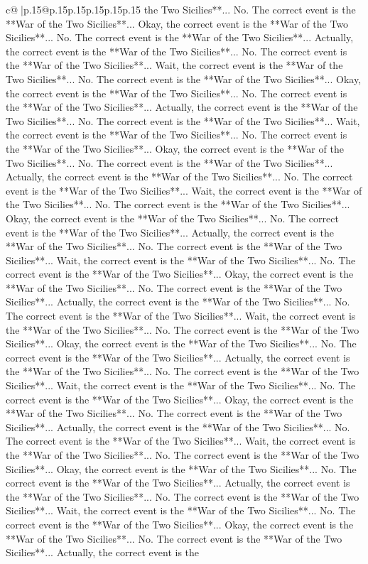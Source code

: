 \documentclass{article}
\begin{document}
{\begin{supertabular}{c@{$\;$}|p{.15\linewidth}@{}p{.15\linewidth}p{.15\linewidth}p{.15\linewidth}p{.15\linewidth}p{.15\linewidth}}
{{{the Two Sicilies**... No. The correct event is the **War of the Two Sicilies**... Okay, the correct event is the **War of the Two Sicilies**... No. The correct event is the **War of the Two Sicilies**... Actually, the correct event is the **War of the Two Sicilies**... No. The correct event is the **War of the Two Sicilies**... Wait, the correct event is the **War of the Two Sicilies**... No. The correct event is the **War of the Two Sicilies**... Okay, the correct event is the **War of the Two Sicilies**... No. The correct event is the **War of the Two Sicilies**... Actually, the correct event is the **War of the Two Sicilies**... No. The correct event is the **War of the Two Sicilies**... Wait, the correct event is the **War of the Two Sicilies**... No. The correct event is the **War of the Two Sicilies**... Okay, the correct event is the **War of the Two Sicilies**... No. The correct event is the **War of the Two Sicilies**... Actually, the correct event is the **War of the Two Sicilies**... No. The correct event is the **War of the Two Sicilies**... Wait, the correct event is the **War of the Two Sicilies**... No. The correct event is the **War of the Two Sicilies**... Okay, the correct event is the **War of the Two Sicilies**... No. The correct event is the **War of the Two Sicilies**... Actually, the correct event is the **War of the Two Sicilies**... No. The correct event is the **War of the Two Sicilies**... Wait, the correct event is the **War of the Two Sicilies**... No. The correct event is the **War of the Two Sicilies**... Okay, the correct event is the **War of the Two Sicilies**... No. The correct event is the **War of the Two Sicilies**... Actually, the correct event is the **War of the Two Sicilies**... No. The correct event is the **War of the Two Sicilies**... Wait, the correct event is the **War of the Two Sicilies**... No. The correct event is the **War of the Two Sicilies**... Okay, the correct event is the **War of the Two Sicilies**... No. The correct event is the **War of the Two Sicilies**... Actually, the correct event is the **War of the Two Sicilies**... No. The correct event is the **War of the Two Sicilies**... Wait, the correct event is the **War of the Two Sicilies**... No. The correct event is the **War of the Two Sicilies**... Okay, the correct event is the **War of the Two Sicilies**... No. The correct event is the **War of the Two Sicilies**... Actually, the correct event is the **War of the Two Sicilies**... No. The correct event is the **War of the Two Sicilies**... Wait, the correct event is the **War of the Two Sicilies**... No. The correct event is the **War of the Two Sicilies**... Okay, the correct event is the **War of the Two Sicilies**... No. The correct event is the **War of the Two Sicilies**... Actually, the correct event is the **War of the Two Sicilies**... No. The correct event is the **War of the Two Sicilies**... Wait, the correct event is the **War of the Two Sicilies**... No. The correct event is the **War of the Two Sicilies**... Okay, the correct event is the **War of the Two Sicilies**... No. The correct event is the **War of the Two Sicilies**... Actually, the correct event is the }}}
\end{supertabular}}
\end{document}
